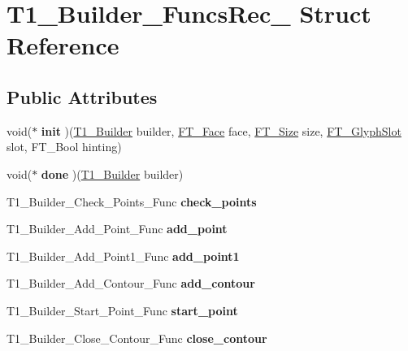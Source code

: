 \hypertarget{struct_t1___builder___funcs_rec__}{}\section{T1\+\_\+\+Builder\+\_\+\+Funcs\+Rec\+\_\+ Struct Reference}
\label{struct_t1___builder___funcs_rec__}
\subsection*{Public Attributes}
\begin{DoxyCompactItemize}
\item 
\mbox{\label{struct_t1___builder___funcs_rec___a5c57e8082c47e5501e19109e69f63256}} 
void($\ast$ {\bfseries init} )(\hyperlink{struct_t1___builder_rec__}{T1\+\_\+\+Builder} builder, \hyperlink{struct_f_t___face_rec__}{F\+T\+\_\+\+Face} face, \hyperlink{struct_f_t___size_rec__}{F\+T\+\_\+\+Size} size, \hyperlink{struct_f_t___glyph_slot_rec__}{F\+T\+\_\+\+Glyph\+Slot} slot, F\+T\+\_\+\+Bool hinting)
\item 
\mbox{\label{struct_t1___builder___funcs_rec___abc3acc445cc942287de8cb4089513aff}} 
void($\ast$ {\bfseries done} )(\hyperlink{struct_t1___builder_rec__}{T1\+\_\+\+Builder} builder)
\item 
\mbox{\label{struct_t1___builder___funcs_rec___a303aa60891edacdc0a9665663577a44a}} 
T1\+\_\+\+Builder\+\_\+\+Check\+\_\+\+Points\+\_\+\+Func {\bfseries check\+\_\+points}
\item 
\mbox{\label{struct_t1___builder___funcs_rec___a8f06e116ae86a88bb3d6d2ea5fd6fdd1}} 
T1\+\_\+\+Builder\+\_\+\+Add\+\_\+\+Point\+\_\+\+Func {\bfseries add\+\_\+point}
\item 
\mbox{\label{struct_t1___builder___funcs_rec___a52113cffcd739ad679c0b162dc81b530}} 
T1\+\_\+\+Builder\+\_\+\+Add\+\_\+\+Point1\+\_\+\+Func {\bfseries add\+\_\+point1}
\item 
\mbox{\label{struct_t1___builder___funcs_rec___af069cac890c0d2d27532a973ffa95a33}} 
T1\+\_\+\+Builder\+\_\+\+Add\+\_\+\+Contour\+\_\+\+Func {\bfseries add\+\_\+contour}
\item 
\mbox{\label{struct_t1___builder___funcs_rec___ab4897186c65875b4312d4ef68aad9d02}} 
T1\+\_\+\+Builder\+\_\+\+Start\+\_\+\+Point\+\_\+\+Func {\bfseries start\+\_\+point}
\item 
\mbox{\label{struct_t1___builder___funcs_rec___abe163896432cc768719bf87cef0d1266}} 
T1\+\_\+\+Builder\+\_\+\+Close\+\_\+\+Contour\+\_\+\+Func {\bfseries close\+\_\+contour}
\end{DoxyCompactItemize}


